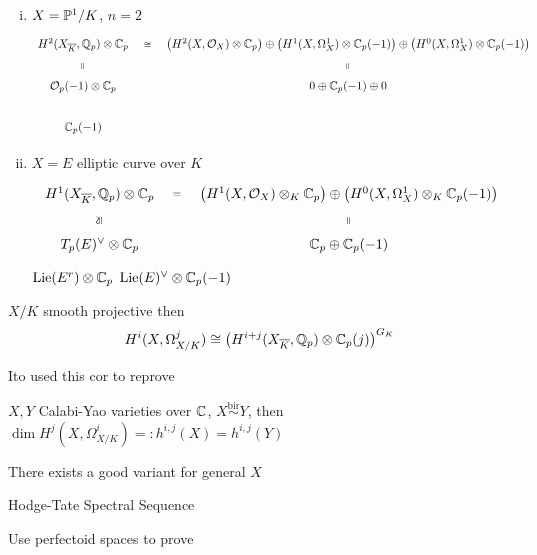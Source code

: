 \begin{ex}
\begin{enumerate}[(i)]
\item $X= \P^1/K$, $n=2$
	\[
	\begin{tikzcd}
	H^2(X_{\ov{K}}, \Q_p) \otimes \C_p \arrow[draw=none]{r}[sloped,auto=false]{\cong} & \left( H^2(X,\O_X) \otimes \C_p \right) \oplus \left( H^1(X,\Omega_X^1) \otimes \C_p(-1) \right) \oplus \left(H^0(X,\Omega_X^1) \otimes \C_p(-1) \right) \\
	\O_p(-1) \otimes \C_p \arrow[draw=none]{u}[sloped,auto=false]{=} & 0 \oplus \C_p(-1) \oplus 0 \arrow[draw=none]{u}[sloped,auto=false]{=} \\
	\C_p(-1)
	\end{tikzcd}
	\]

\item $X=E$ elliptic curve over $K$
	\[
	\begin{tikzcd}
	H^1(X_{\ov{K}},\Q_p) \otimes \C_p \arrow[draw=none]{r}[sloped,auto=false]{=} & \left(H^1(X,\O_X) \otimes_K \C_p \right) \oplus \left(H^0(X,\Omega_X^1) \otimes_K \C_p(-1) \right) \\
	T_p(E)^\vee \otimes \C_p \arrow[draw=none]{u}[sloped,auto=false]{\cong} & \C_p  \oplus \C_p(-1) \arrow[draw=none]{u}[sloped,auto=false]{=}
	\end{tikzcd}
	\]
$\Lie(E^r) \otimes \C_p$
$\Lie(E)^\vee \otimes \C_p(-1)$
\end{enumerate}
\end{ex}

\begin{cor}
$X/K$ smooth projective then 
	\[
	H^i(X,\Omega^j_{X/K}) \cong \left( H^{i+j}(X_{\ov{K}}, \Q_p) \otimes \C_p(j) \right)^{G_K}
	\]
\end{cor}

\begin{rem}
Ito used this cor to reprove
\end{rem}

\begin{thm}
$X,Y$ Calabi-Yao varieties over $\C$, $X \stackrel{\text{bir}}{\sim} Y$, then $\dim H^j(X,\Omega^i_{X/K})=:h^{i,j}(X) = h^{i,j}(Y)$
\end{thm}

\begin{rem}
There exists a good variant for general $X$
\end{rem}


Hodge-Tate Spectral Sequence

Use perfectoid spaces to prove

